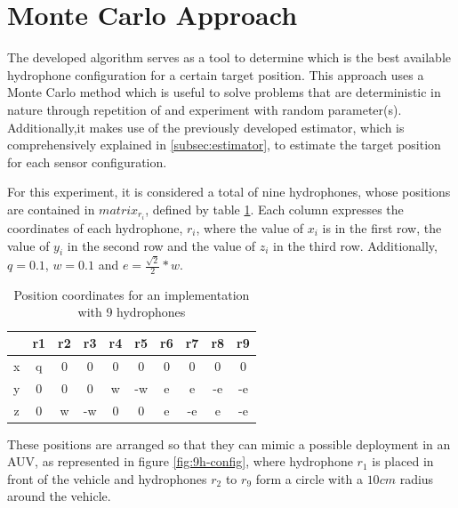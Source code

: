 \section{Monte Carlo Approach} \label{sec:config-perf}

The developed algorithm serves as a tool to determine which is the best available hydrophone configuration for a certain target position. This approach uses a Monte Carlo method which is useful to solve problems that are deterministic in nature through repetition of and experiment with random parameter(s). Additionally,it makes use of the previously developed estimator, which is comprehensively explained in \ref{subsec:estimator}, to estimate the target position for each sensor configuration.
		
For this experiment, it is considered a total of nine hydrophones, whose positions are contained in $matrix_{r_{i}}$, defined by table \ref{tab:config-9h}. Each column expresses the coordinates of each hydrophone, $r_i$, where the value of $x_i$ is in the first row, the value of $y_i$ in the second row and the value of $z_i$ in the third row. Additionally, $q = 0.1$, $w = 0.1$ and $e = \frac{ \sqrt{2}}{2} * w$.

\begin{table}[!htbp] %
	\begin{center}
		\begin{tabular}{c | c c c c c c c c c}
			\toprule
			& r1 & r2 & r3 & r4	& r5 & r6 & r7 & r8	& r9 \\ \hline 
			\multirow{1}{0.5em}{x} 
			& q & 0 & 0 & 0 & 0 & 0 & 0 & 0 & 0\\
			\midrule 
			\multirow{1}{0.5em}{y} 
			& 0 & 0 & 0 & w & -w & e & e & -e & -e\\
			\midrule 
			\multirow{1}{0.5em}{z} 
			& 0 & w & -w & 0 & 0 & e & -e & e & -e \\
			\bottomrule 
		\end{tabular}
		\caption{Position coordinates for an implementation with 9 hydrophones}
		\label{tab:config-9h}
	\end{center}
\end{table}

These positions are arranged so that they can mimic a possible deployment in an AUV, as represented in figure \ref{fig:9h-config}, where hydrophone $r_1$ is placed in front of the vehicle and hydrophones $r_2$ to $r_9$ form a circle with a $10 cm$ radius around the vehicle.

